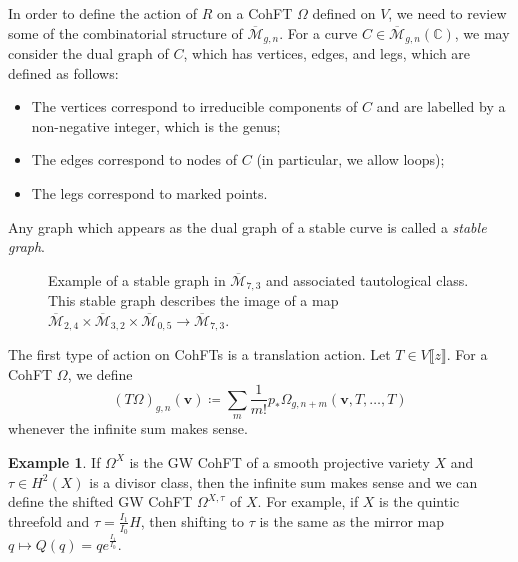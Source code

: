 \documentclass[10pt]{amsart}
\theoremstyle{definition}
\newtheorem{exm}[thm]{Example}
\theoremstyle{remark}
\theoremstyle{plain}
\theoremstyle{definition}
\theoremstyle{remark}
\newcommand{\C}{\mathbb{C}}
\newcommand{\Mbar}{\overline{\mathcal{M}}}
\newcommand{\mc}[1]{\mathcal{#1}}
\newcommand{\mbf}[1]{\mathbf{#1}}
\newcommand{\bv}{\mbf{v}}
\newcommand{\ol}[1]{\overline{#1}}
\newcommand{\1}{\mathbf{1}}
\newcommand{\2}{\mathbf{2}}
\newcommand{\3}{\mathbf{3}}
\newcommand{\ps}[1]{\llbracket #1 \rrbracket}
\begin{document}
In order to define the action of $R$ on a CohFT $\Omega$ defined on $V$, we need to review some of the combinatorial structure of $\Mbar_{g,n}$. For a curve $C\in \Mbar_{g,n}(\C)$, we may consider the dual graph of $C$, which has vertices, edges, and legs, which are defined as follows:
\begin{itemize}
    \item The vertices correspond to irreducible components of $C$ and are labelled by a non-negative integer, which is the genus;
    \item The edges correspond to nodes of $C$ (in particular, we allow loops);
    \item The legs correspond to marked points.
\end{itemize}
Any graph which appears as the dual graph of a stable curve is called a \textit{stable graph}.

\begin{figure}[htpb]
  \centering
  \caption{Example of a stable graph in $\ol{\mc{M}}_{7,3}$ and associated tautological class. This stable graph describes the image of a map
    $\ol{\mc{M}}_{2,4} \times \ol{\mc{M}}_{3,2} \times \ol{\mc{M}}_{0,5} \to \ol{\mc{M}}_{7,3}$.}
  \label{fig:stablegraph}
\end{figure}

The first type of action on CohFTs is a translation action. Let $T \in V\ps{z}$. For a CohFT $\Omega$, we define
\[ (T\Omega)_{g,n}(\bv) \coloneqq \sum_m \frac{1}{m!} p_* \Omega_{g,n+m}(\bv, T,\ldots,T) \]
whenever the infinite sum makes sense.

\begin{exm}
    If $\Omega^X$ is the GW CohFT of a smooth projective variety $X$ and $\tau \in H^2(X)$ is a divisor class, then the infinite sum makes sense and we can define the shifted GW CohFT $\Omega^{X,\tau}$ of $X$. For example, if $X$ is the quintic threefold and $\tau = \frac{I_1}{I_0} H$, then shifting to $\tau$ is the same as the mirror map $q \mapsto Q(q) = q e^{\frac{I_1}{I_0}}$.
\end{exm}
\end{document}
